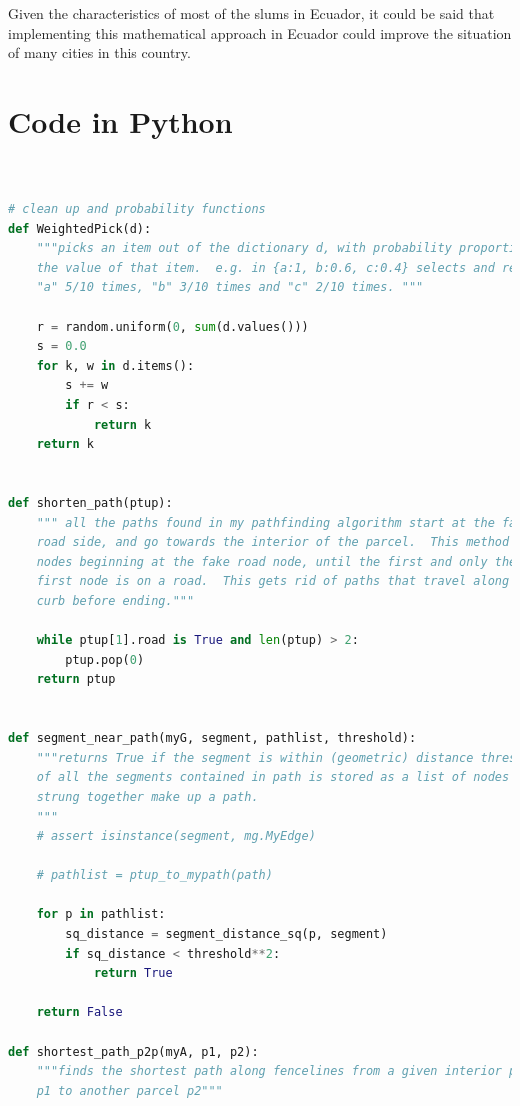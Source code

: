 \documentclass[10pt]{article}
\begin{document}
Given the characteristics of most of the slums in Ecuador, it could be said that implementing this mathematical approach in Ecuador could improve the situation of many cities in this country.


 
 

\appendix  
\clearpage %
\addappheadtotoc 
\appendixpage

\section{Code in Python}
\begin{lstlisting}[language=Python]


# clean up and probability functions
def WeightedPick(d):
    """picks an item out of the dictionary d, with probability proportional to
    the value of that item.  e.g. in {a:1, b:0.6, c:0.4} selects and returns
    "a" 5/10 times, "b" 3/10 times and "c" 2/10 times. """

    r = random.uniform(0, sum(d.values()))
    s = 0.0
    for k, w in d.items():
        s += w
        if r < s:
            return k
    return k
    
    
def shorten_path(ptup):
    """ all the paths found in my pathfinding algorithm start at the fake
    road side, and go towards the interior of the parcel.  This method drops
    nodes beginning at the fake road node, until the first and only the
    first node is on a road.  This gets rid of paths that travel along a
    curb before ending."""

    while ptup[1].road is True and len(ptup) > 2:
        ptup.pop(0)
    return ptup


def segment_near_path(myG, segment, pathlist, threshold):
    """returns True if the segment is within (geometric) distance threshold
    of all the segments contained in path is stored as a list of nodes that
    strung together make up a path.
    """
    # assert isinstance(segment, mg.MyEdge)

    # pathlist = ptup_to_mypath(path)

    for p in pathlist:
        sq_distance = segment_distance_sq(p, segment)
        if sq_distance < threshold**2:
            return True

    return False
    
def shortest_path_p2p(myA, p1, p2):
    """finds the shortest path along fencelines from a given interior parcel
    p1 to another parcel p2"""


\end{lstlisting}
\end{document}

